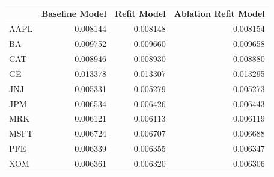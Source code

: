 \begin{tabular}{lrrr}
\toprule
 & Baseline Model & Refit Model & Ablation Refit Model \\
\midrule
AAPL & 0.008144 & 0.008148 & 0.008154 \\
BA & 0.009752 & 0.009660 & 0.009658 \\
CAT & 0.008946 & 0.008930 & 0.008880 \\
GE & 0.013378 & 0.013307 & 0.013295 \\
JNJ & 0.005331 & 0.005279 & 0.005273 \\
JPM & 0.006534 & 0.006426 & 0.006443 \\
MRK & 0.006121 & 0.006113 & 0.006119 \\
MSFT & 0.006724 & 0.006707 & 0.006688 \\
PFE & 0.006339 & 0.006355 & 0.006347 \\
XOM & 0.006361 & 0.006320 & 0.006306 \\
\bottomrule
\end{tabular}
